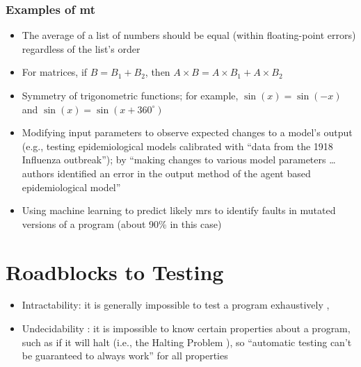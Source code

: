 \subsubsection{Examples of \acs{mt}}
\begin{itemize}
      \item The average of a list of numbers should be equal (within
            floating-point errors) regardless of the list's order
            \citep[p.~67]{KanewalaAndYuehChen2019}
      \item For matrices, if $B = B_1 + B_2$, then $A \times B = A \times B_1
                  + A \times B_2$ \citep[pp.~68-69]{KanewalaAndYuehChen2019}
      \item Symmetry of trigonometric functions; for example, $\sin(x) = \sin(-x)$
            and $\sin(x) = \sin(x + 360^{\circ})$ \citep[p.~70]{KanewalaAndYuehChen2019}
      \item Modifying input parameters to observe expected changes to a model's
            output (e.g., testing epidemiological models calibrated with
            ``data from the 1918 Influenza outbreak''); by ``making changes to
            various model parameters \dots authors identified an error in the
            output method of the agent based epidemiological model''
            \citep[p.~70]{KanewalaAndYuehChen2019}
      \item Using machine learning to predict likely \acsp{mr} to identify
            faults in mutated versions of a program (about 90\% in this case)
            \citep[p.~71]{KanewalaAndYuehChen2019}
\end{itemize}

\section{Roadblocks to Testing}

\begin{itemize}
      \item Intractability: it is generally impossible to test a program
            exhaustively \citep[p.~421]{vanVliet2000},
            \citep[pp.~439, 461]{PetersAndPedrycz2000}
      \item Undecidability \citep[p.~439]{PetersAndPedrycz2000}: it is
            impossible to know certain properties about a program, such as if
            it will halt (i.e., the Halting Problem
            \citep[p.~4]{gurfinkel_testing_2017}), so ``automatic testing
            can't be guaranteed to always work'' for all properties
            \citep{nelson_formal_1999} 
\end{itemize}


